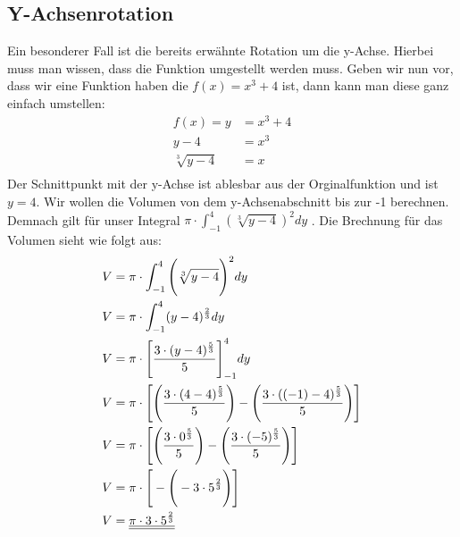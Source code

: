 \documentclass[a4paper,12pt]{article}
\begin{document}
\subsection{Y-Achsenrotation}
Ein besonderer Fall ist die bereits erwähnte Rotation um die y-Achse. Hierbei muss man wissen, dass die Funktion umgestellt werden muss.
Geben wir nun vor, dass wir eine Funktion haben die $f(x) = x^3 + 4$ ist, dann kann man diese ganz einfach umstellen:
\begin{equation*}
\begin{split}
f(x) = y & = x^3 + 4\\
y - 4 & = x^3\\
\sqrt[3]{y - 4} & = x\\
\end{split}
\end{equation*}
Der Schnittpunkt mit der y-Achse ist ablesbar aus der Orginalfunktion und ist $y = 4$.
Wir wollen die Volumen von dem y-Achsenabschnitt bis zur -1 berechnen. Demnach gilt für unser Integral $\pi \cdot \int_{-1}^{4} (\sqrt[3]{y - 4})^2 dy$ .
Die Brechnung für das Volumen sieht wie folgt aus:
\begin{equation*}
\begin{split}
V & = \pi \cdot \int_{-1}^{4} \Bigg{(}\sqrt[3]{y - 4}\Bigg{)}^2 dy\\
V & = \pi \cdot \int_{-1}^{4} (y - 4)^{\frac{2}{3}} dy\\
V & = \pi \cdot \Bigg{[} \frac{3\cdot(y-4)^\frac{5}{3}}{5}\Bigg{]}_{-1}^{4} dy\\
V & = \pi \cdot \Bigg{[} \Bigg{(} \frac{3\cdot(4-4)^\frac{5}{3}}{5}\Bigg{)} - \Bigg{(} \frac{3\cdot((-1)-4)^\frac{5}{3}}{5}\Bigg{)} \Bigg{]}\\
V & = \pi \cdot \Bigg{[} \Bigg{(} \frac{3\cdot0^\frac{5}{3}}{5}\Bigg{)} - \Bigg{(} \frac{3\cdot(-5)^\frac{5}{3}}{5}\Bigg{)} \Bigg{]}\\
V & = \pi \cdot \Bigg{[} - \Bigg{(} -3\cdot5^\frac{2}{3}\Bigg{)} \Bigg{]}\\
V & = \underline{\underline{\pi \cdot 3 \cdot 5^\frac{2}{3}}}
\end{split}
\end{equation*}
\pagebreak
\end{document}
